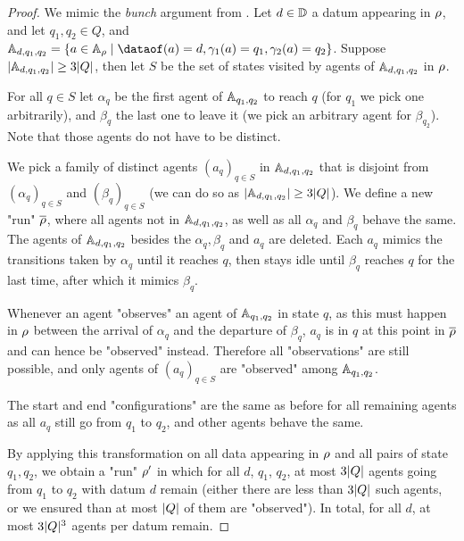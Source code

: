 \begin{proof}
	We mimic the \emph{bunch} argument from \cite{EsparzaRW2019}. 
	Let $d\in \mathbb{D}$ a datum appearing in $\rho$, and let $q_1, q_2 \in Q$, and $\Agentset_{d, q_1, q_2} = \set{a \in \Agentset_{\run} \mid \dataof(a) = d, \config_1(a) = q_1, \config_2(a) = q_2}$. Suppose $|\mathbb{A}_{d, q_1, q_2}| \geq 3|Q|$, then let $S$ be the set of states visited by agents of $\mathbb{A}_{d, q_1, q_2}$ in $\rho$.
	
	For all $q \in S$ let $\alpha_q$ be the first agent of $\mathbb{A}_{q_1, q_2}$ to reach $q$ (for $q_1$ we pick one arbitrarily), and $\beta_q$ the last one to leave it (we pick an arbitrary agent for $\beta_{q_2}$). 
	Note that those agents do not have to be distinct.
	
	We pick a family of distinct agents $(a_q)_{q \in S}$ in $\mathbb{A}_{d, q_1, q_2}$ that is disjoint from $(\alpha_q)_{q \in S}$ and $(\beta_q)_{q \in S}$ (we can do so as $|\mathbb{A}_{d, q_1, q_2}| \geq 3|Q|$).
	We define a new "run" $\overline{\rho}$, where all agents not in $\mathbb{A}_{d, q_1, q_2}$, as well as all $\alpha_q$ and $\beta_q$ behave the same. The agents of $\mathbb{A}_{d, q_1, q_2}$ besides the $\alpha_q, \beta_q$ and $a_q$ are deleted.
	Each $a_q$ mimics the transitions taken by $\alpha_q$ until it reaches $q$, then stays idle until $\beta_q$ reaches $q$ for the last time, after which it mimics $\beta_q$. 
	
	Whenever an agent "observes" an agent of $\mathbb{A}_{q_1, q_2}$ in state $q$, as this must happen in $\rho$ between the arrival of $\alpha_q$ and the departure of $\beta_q$, $a_q$ is in $q$ at this point in $\overline{\rho}$ and can hence be "observed" instead. Therefore all "observations" are still possible, and only agents of $(a_{q})_{q\in S}$ are "observed" among $\mathbb{A}_{q_1, q_2}$.
	
	The start and end "configurations" are the same as before for all remaining agents as all $a_q$ still go from $q_1$ to $q_2$, and other agents behave the same.
	
	By applying this transformation on all data appearing in $\rho$ and all pairs of state $q_1, q_2$, we obtain a "run" $\rho'$ in which for all $d$, $q_1$, $q_2$, at most $3|Q|$ agents going from $q_1$ to $q_2$ with datum $d$ remain (either there are less than $3|Q|$ such agents, or we ensured than at most $|Q|$ of them are "observed").
	In total, for all $d$, at most $3|Q|^3$ agents per datum remain.
\end{proof}

